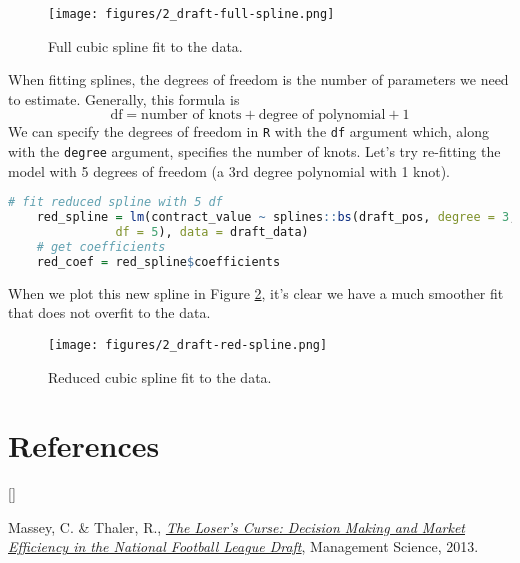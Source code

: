 \documentclass[twoside]{article}
\def\beginrefs{\begin{list}%
        {[\arabic{equation}]}{\usecounter{equation}
         \setlength{\leftmargin}{2.0truecm}\setlength{\labelsep}{0.4truecm}%
         \setlength{\labelwidth}{1.6truecm}}}
\def\endrefs{\end{list}}
\def\bibentry#1{\item[\hbox{[#1]}]}
\theoremstyle{definition}
\begin{document}
\begin{figure}[h]
    \centering
    \texttt{[image: figures/2\_draft-full-spline.png]}
    \caption{Full cubic spline fit to the data.}
    \label{fig:draft-full-spline}
\end{figure}

When fitting splines, the degrees of freedom is the number of parameters we need to estimate. Generally, this formula is
\begin{equation}
    \text{df} = \text{number of knots} + \text{degree of polynomial} + 1
\end{equation}
We can specify the degrees of freedom in \texttt{R} with the \texttt{df} argument which, along with the \texttt{degree} argument, specifies the number of knots. Let's try re-fitting the model with 5 degrees of freedom (a 3rd degree polynomial with 1 knot).
\begin{lstlisting}[language=R]
    # fit reduced spline with 5 df
    red_spline = lm(contract_value ~ splines::bs(draft_pos, degree = 3,
               df = 5), data = draft_data)
    # get coefficients
    red_coef = red_spline$coefficients
\end{lstlisting}
When we plot this new spline in Figure \ref{fig:draft-red-spline}, it's clear we have a much smoother fit that does not overfit to the data.
\begin{figure}[H]
    \centering
    \texttt{[image: figures/2\_draft-red-spline.png]}
    \caption{Reduced cubic spline fit to the data.}
    \label{fig:draft-red-spline}
\end{figure}

\section*{References}
\beginrefs
\bibentry{M-T}{Massey, C. \& Thaler, R.}, 
{\it \href{https://faculty.wharton.upenn.edu/wp-content/uploads/2013/08/massey---thaler---losers-curse---management-science-july-2013.pdf}{The Loser's Curse: Decision Making and Market
Efficiency in the National Football League Draft}},
{Management Science},
{2013}.
\endrefs
\end{document}

